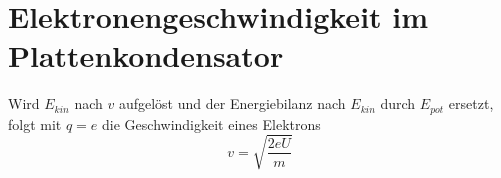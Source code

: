 \documentclass{article}
\begin{document}
  
\section{Elektronengeschwindigkeit im Plattenkondensator} 
Wird \hyperref[Energiebilanz zwischen Plattenkondensatoren]{$E_{kin}$} nach $v$ aufgelöst und der Energiebilanz nach $E_{kin}$ durch $E_{pot}$ ersetzt, folgt mit $q=e$ die Geschwindigkeit eines Elektrons
\[
 v = \sqrt{\frac{2 eU}{m}}
\]
\end{document}
